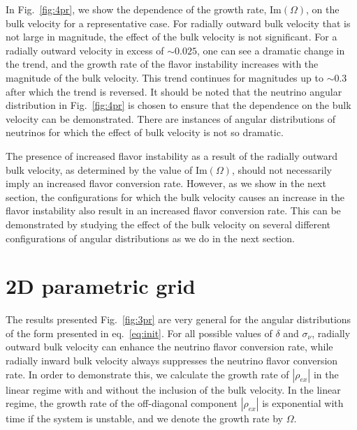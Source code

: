\documentclass[aps, prd, 10pt, twocolumn, superscriptaddress, noshowpacs, preprintnumbers, longbibliography, groupedaddress, footinbib, bibnotes]{revtex4-1}
\begin{document}
In Fig.~\ref{fig:4pr}, we show the dependence of the growth rate, $\mathrm{Im}(\Omega)$, on the bulk velocity for a representative case. For radially outward bulk velocity that is not large in magnitude, the effect of the bulk velocity is not significant. For a radially outward velocity in excess of $\sim 0.025$, one can see a dramatic change in the trend, and the growth rate of the flavor instability increases with the magnitude of the bulk velocity. This trend continues for magnitudes up to $\sim 0.3$ after which the trend is reversed. 
It should be noted that the neutrino angular distribution in Fig.~\ref{fig:4pr} is chosen to ensure that the dependence on the bulk velocity can be demonstrated. There are instances of angular distributions of neutrinos for which the effect of bulk velocity is not so dramatic. 

The presence of increased flavor instability as a result of the radially outward bulk velocity, as determined by the value of $\textrm{Im}(\Omega)$, should not necessarily imply an increased flavor conversion rate. However, as we show in the next section, the configurations for which the bulk velocity causes an increase in the flavor instability also result in an increased flavor conversion rate. This can be demonstrated by studying the effect of the bulk velocity on several different configurations of angular distributions as we do in the next section.


\section{2D parametric grid}
\label{sec:grid}

The results presented Fig.~\ref{fig:3pr} are very general for the angular distributions of the form presented in eq.~\ref{eq:init}. For all possible values of $\delta$ and $\sigma_{\nu}$, radially outward bulk velocity can enhance the neutrino flavor conversion rate, while radially inward bulk velocity always suppresses the neutrino flavor conversion rate. In order to demonstrate this, we calculate the growth rate of $|\rho_{ex}|$ in the linear regime with and without the inclusion of the bulk velocity. In the linear regime, the growth rate of the off-diagonal component $|\rho_{ex}|$ is exponential with time if the system is unstable, and we denote the growth rate by $\Omega$. 
\end{document}
